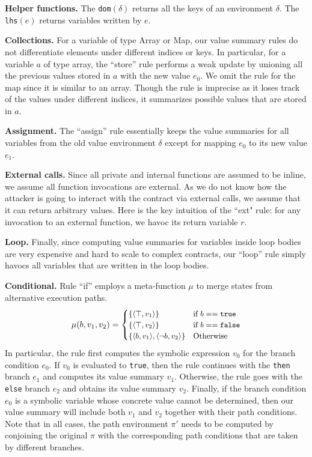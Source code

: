 \documentclass[conference, romanappendices]{tex/IEEEtran}
\theoremstyle{bfnote}
\newcommand{\valEnv}{\delta}
\newcommand{\pathEnv}{\pi}
\newcommand{\union}{\mu}
\begin{document}
\noindent
\textbf{Helper functions.}
The \texttt{dom}$(\valEnv)$ returns all the keys of an environment $\valEnv$. The \texttt{lhs}$(e)$ returns variables written by $e$. 

\noindent
\textbf{Collections.}
For a variable of type Array or Map, our value summary rules do not differentiate elements under different indices or keys. In particular, for a variable $a$ of type array, the ``store'' rule performs a weak update by unioning all the previous values stored in $a$ with the new value $e_0$. We omit the rule for the map since it is similar to an array. Though the rule is imprecise as it loses track of the values under different indices, it summarizes possible values that are stored in $a$.

\noindent
\textbf{Assignment.}
The ``assign'' rule essentially keeps the value summaries for all variables from the old value environment $\valEnv$ except for mapping $e_0$ to its new value $e_1$. 


\noindent
\textbf{External calls.} 
Since all private and internal functions are assumed to be inline, we assume all function invocations are external. 
As we do not know how the attacker is going to interact with the contract via external calls, we assume that it can return arbitrary values. Here is the key intuition of the ``{ext\EndAccSupp{}}" rule: for any invocation to an external function, 
we havoc its return variable $r$.

\noindent
\textbf{Loop.}
Finally, since computing value summaries for variables inside loop bodies are very expensive and hard to scale to complex contracts, our ``loop'' rule simply havocs all variables that are written in the loop bodies.

\noindent
\textbf{Conditional.}
Rule ``if'' employs a meta-function $\union$ to merge states from alternative execution paths.
\vspace{-1.5mm}
\[
\small
\union(b, v_1, v_2) = 
\begin{cases}
  \{ \langle \top, v_1 \rangle \} & \text{if } b== \mathtt{true}\\    
  \{ \langle \top, v_2 \rangle \} & \text{if } b== \mathtt{false}\\    
  \{ \langle b, v_1 \rangle, \langle \neg b, v_2 \rangle \} & \text{Otherwise }\\     
\end{cases}
\]
In particular, the rule first computes the symbolic expression $v_0$ for the branch condition $e_0$. If $v_0$ is evaluated to \texttt{true}, then the rule continues with the \texttt{then} branch $e_1$ and computes its value summary $v_1$.
Otherwise, the rule goes with the \texttt{else} branch $e_2$ and obtains its value summary $v_2$. Finally, if the branch condition $e_0$ is a symbolic variable whose concrete value cannot be determined, then our value summary will include both $v_1$ and $v_2$ together with their path conditions.
Note that in all cases, the path environment $\pathEnv'$ needs to be computed by conjoining the original $\pathEnv$ with the corresponding path conditions that are taken by different branches.
\end{document}
